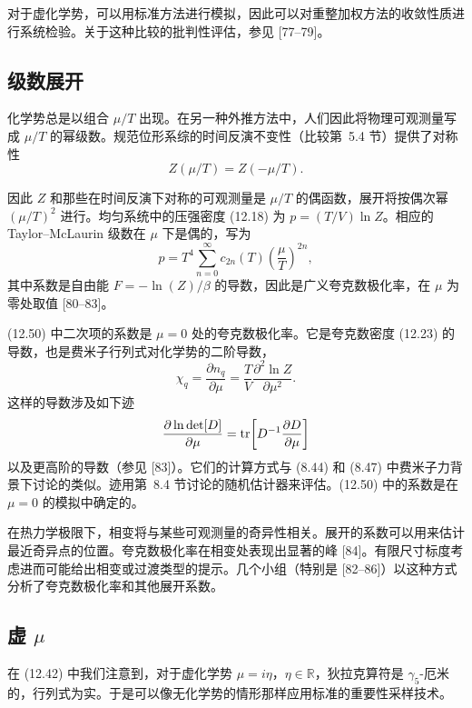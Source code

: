 对于虚化学势，可以用标准方法进行模拟，因此可以对重整加权方法的收敛性质进行系统检验。关于这种比较的批判性评估，参见 [77--79]。

\subsection{级数展开}

化学势总是以组合 $\mu/T$ 出现。在另一种外推方法中，人们因此将物理可观测量写成 $\mu/T$ 的幂级数。规范位形系综的时间反演不变性（比较第~5.4 节）提供了对称性
\begin{equation}
  Z(\mu/T) = Z(-\mu/T).
\end{equation}

因此 $Z$ 和那些在时间反演下对称的可观测量是 $\mu/T$ 的偶函数，展开将按偶次幂 $(\mu/T)^2$ 进行。均匀系统中的压强密度 (12.18) 为 $p = (T/V)\ln Z$。相应的 Taylor--McLaurin 级数在 $\mu$ 下是偶的，写为
\begin{equation}
  p = T^4\sum_{n=0}^{\infty} c_{2n}(T)\left(\frac{\mu}{T}\right)^{2n},
\end{equation}
其中系数是自由能 $F = -\ln(Z)/\beta$ 的导数，因此是广义夸克数极化率，在 $\mu$ 为零处取值 [80--83]。

(12.50) 中二次项的系数是 $\mu = 0$ 处的夸克数极化率。它是夸克数密度 (12.23) 的导数，也是费米子行列式对化学势的二阶导数，
\begin{equation}
  \chi_q = \frac{\partial n_q}{\partial\mu}
    = \frac{T}{V}\frac{\partial^2\ln Z}{\partial\mu^2}.
\end{equation}
这样的导数涉及如下迹
\begin{equation}
  \frac{\partial\ln\det[D]}{\partial\mu}
  = \operatorname{tr}\!\left[D^{-1}\frac{\partial D}{\partial\mu}\right]
\end{equation}
以及更高阶的导数（参见 [83]）。它们的计算方式与 (8.44) 和 (8.47) 中费米子力背景下讨论的类似。迹用第~8.4 节讨论的随机估计器来评估。(12.50) 中的系数是在 $\mu = 0$ 的模拟中确定的。

在热力学极限下，相变将与某些可观测量的奇异性相关。展开的系数可以用来估计最近奇异点的位置。夸克数极化率在相变处表现出显著的峰 [84]。有限尺寸标度考虑进而可能给出相变或过渡类型的提示。几个小组（特别是 [82--86]）以这种方式分析了夸克数极化率和其他展开系数。

\subsection{虚 $\mu$}

在 (12.42) 中我们注意到，对于虚化学势 $\mu = i\eta$，$\eta \in \mathbb{R}$，狄拉克算符是 $\gamma_5$-厄米的，行列式为实。于是可以像无化学势的情形那样应用标准的重要性采样技术。

